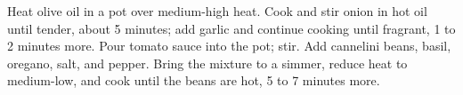 \begin{recipe}

\begin{recipemeta}
\end{recipemeta}

\begin{recipetext}
Heat olive oil in a pot over medium-high heat. Cook and stir onion in hot oil until tender, about 5 minutes; add garlic and continue cooking until fragrant, 1 to 2 minutes more.
Pour tomato sauce into the pot; stir. Add cannelini beans, basil, oregano, salt, and pepper. Bring the mixture to a simmer, reduce heat to medium-low, and cook until the beans are hot, 5 to 7 minutes more.
\end{recipetext}

\end{recipe}
